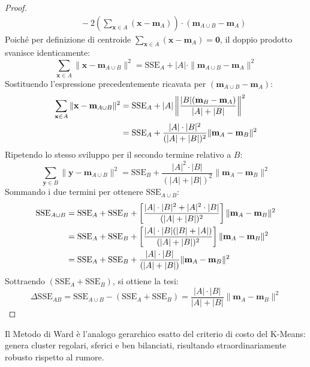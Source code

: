 \begin{proof}
\begin{align}
    &\quad - 2 \left( \sum_{\mathbf{x} \in A} (\mathbf{x} - \mathbf{m}_A) \right) \cdot (\mathbf{m}_{A \cup B} - \mathbf{m}_A)
\end{align}
Poiché per definizione di centroide $\sum_{\mathbf{x} \in A} (\mathbf{x} - \mathbf{m}_A) = \mathbf{0}$, il doppio prodotto svanisce identicamente:
\begin{equation}
    \sum_{\mathbf{x} \in A} \|\mathbf{x} - \mathbf{m}_{A \cup B}\|^2 = \mathrm{SSE}_A + |A| \cdot \|\mathbf{m}_{A \cup B} - \mathbf{m}_A\|^2
\end{equation}
Sostituendo l'espressione precedentemente ricavata per $(\mathbf{m}_{A \cup B} - \mathbf{m}_A)$:
\begin{align}
    \sum_{\mathbf{x} \in A} \|\mathbf{x} - \mathbf{m}_{A \cup B}\|^2 &= \mathrm{SSE}_A + |A| \left\| \frac{|B|(\mathbf{m}_B - \mathbf{m}_A)}{|A| + |B|} \right\|^2 \notag \\
    &= \mathrm{SSE}_A + \frac{|A| \cdot |B|^2}{(|A| + |B|)^2} \|\mathbf{m}_A - \mathbf{m}_B\|^2
\end{align}
Ripetendo lo stesso sviluppo per il secondo termine relativo a $B$:
\begin{equation}
    \sum_{\mathbf{y} \in B} \|\mathbf{y} - \mathbf{m}_{A \cup B}\|^2 = \mathrm{SSE}_B + \frac{|A|^2 \cdot |B|}{(|A| + |B|)^2} \|\mathbf{m}_A - \mathbf{m}_B\|^2
\end{equation}
Sommando i due termini per ottenere $\mathrm{SSE}_{A \cup B}$:
\begin{align}
    \mathrm{SSE}_{A \cup B} &= \mathrm{SSE}_A + \mathrm{SSE}_B + \left[ \frac{|A| \cdot |B|^2 + |A|^2 \cdot |B|}{(|A| + |B|)^2} \right] \|\mathbf{m}_A - \mathbf{m}_B\|^2 \notag \\
    &= \mathrm{SSE}_A + \mathrm{SSE}_B + \left[ \frac{|A| \cdot |B| (|B| + |A|)}{(|A| + |B|)^2} \right] \|\mathbf{m}_A - \mathbf{m}_B\|^2 \notag \\
    &= \mathrm{SSE}_A + \mathrm{SSE}_B + \frac{|A| \cdot |B|}{(|A| + |B|)} \|\mathbf{m}_A - \mathbf{m}_B\|^2
\end{align}
Sottraendo $(\mathrm{SSE}_A + \mathrm{SSE}_B)$, si ottiene la tesi:
\begin{equation}
    \Delta \mathrm{SSE}_{AB} = \mathrm{SSE}_{A \cup B} - (\mathrm{SSE}_A + \mathrm{SSE}_B) = \frac{|A| \cdot |B|}{|A| + |B|} \|\mathbf{m}_A - \mathbf{m}_B\|^2
\end{equation}
\end{proof}

Il Metodo di Ward è l'analogo gerarchico esatto del criterio di costo del K-Means: genera cluster regolari, sferici e ben bilanciati, risultando straordinariamente robusto rispetto al rumore.

